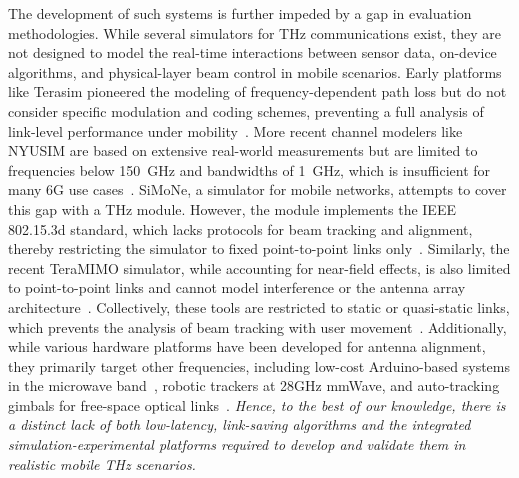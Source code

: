 \documentclass[fleqn,10pt]{wlscirep}
\begin{document}
The development of such systems is further impeded by a gap in evaluation methodologies. While several simulators for THz communications exist, they are not designed to model the real-time interactions between sensor data, on-device algorithms, and physical-layer beam control in mobile scenarios. Early platforms like Terasim pioneered the modeling of frequency-dependent path loss but do not consider specific modulation and coding schemes, preventing a full analysis of link-level performance under mobility~\cite{HOSSAIN2019100004, eckhardt2022modular}. More recent channel modelers like NYUSIM are based on extensive real-world measurements but are limited to frequencies below 150~GHz and bandwidths of 1~GHz, which is insufficient for many 6G use cases~\cite{10367974}. SiMoNe, a simulator for mobile networks, attempts to cover this gap with a THz module. However, the module implements the IEEE 802.15.3d standard, which lacks protocols for beam tracking and alignment, thereby restricting the simulator to fixed point-to-point links only~\cite{rose2015simone, eckhardt2022modular}. Similarly, the recent TeraMIMO simulator, while accounting for near-field effects, is also limited to point-to-point links and cannot model interference or the antenna array architecture~\cite{tarboush2021teramimo, bodet2023directional}. Collectively, these tools are restricted to static or quasi-static links, which prevents the analysis of beam tracking with user movement~\cite{Petrov2023Mobile}. Additionally, while various hardware platforms have been developed for antenna alignment, they primarily target other frequencies, including low-cost Arduino-based systems in the microwave band~\cite{Abdulwahab2020}, robotic trackers at 28GHz mmWave\cite{Keshavamurthy2022}, and auto-tracking gimbals for free-space optical links~\cite{AlAkkoumi2008}. \emph{Hence, to the best of our knowledge, there is a distinct lack of both low-latency, link-saving algorithms and the integrated simulation-experimental platforms required to develop and validate them in realistic mobile THz scenarios.}
\end{document}
